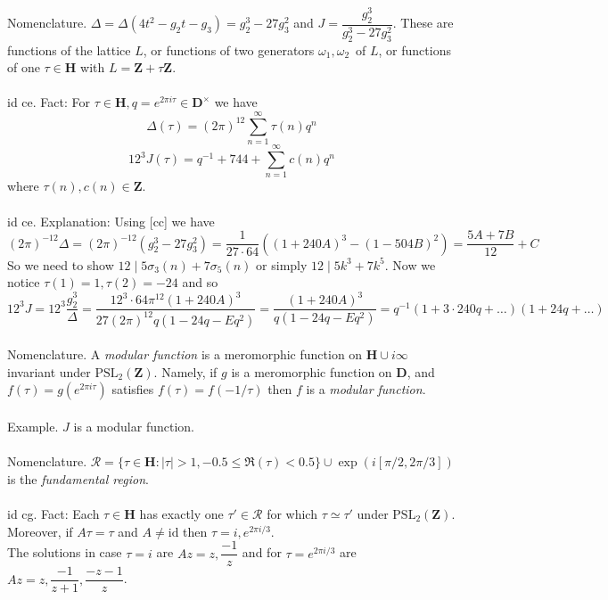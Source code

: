 \documentclass[oneside]{book}
\newcommand{\Z}{\mathbf{Z}}
\newcommand{\PSL}{\mathrm{PSL}}
\newcommand{\set}[1]{\{ #1\}}
\newcommand{\fit}[1]{\left( #1\right)}
\newcommand{\inv}{^{-1}}
\newcommand{\abs}[1]{\left\lvert #1\right\rvert}
\newcommand{\id}{\mathrm{id}}
\renewcommand{\H}{\mathbf{H}}
\newcommand{\D}{\mathbf{D}}
\newcommand{\RR}{\mathscr{R}}
\begin{document}
Nomenclature. $\Delta=\Delta(4t^2-g_2t-g_3)=g_2^3-27g_3^2$ and $J=\dfrac{g_2^3}{g_2^3-27g_3^2}$. These are functions of the lattice $L$, or functions of two generators $\omega_1,\omega_2$\ of $L$, or functions of one $\tau\in\H$ with $L=\Z+\tau\Z$.\\\\


id ce. Fact: For $\tau\in\H, q=e^{2\pi i\tau}\in\D^\times$ we have $$\Delta(\tau)=(2\pi)^{12}\sum_{n=1}^\infty \tau(n)q^n$$
$$12^3J(\tau)=q\inv + 744 + \sum_{n=1}^\infty c(n)q^n$$
where $\tau(n),c(n)\in\Z$.\\\\


id ce. Explanation: Using [cc] we have $$(2\pi)^{-12}\Delta=(2\pi)^{-12}\fit{g_2^3-27g_3^2}=\dfrac{1}{27\cdot 64}\fit{(1+240A)^3 - (1-504B)^2} = \dfrac{5A+7B}{12}+ C $$ 
So we need to show $12\mid 5\sigma_3(n)+7\sigma_5(n)$ or simply $12\mid 5k^3+7k^5$. Now we notice $\tau(1)=1, \tau(2)=-24$ and so
$$12^3J = 12^3 \dfrac{g_2^3}{\Delta} = \dfrac{12^3 \cdot 64\pi^{12}(1+240A)^3}{27(2\pi)^{12}q(1-24q-Eq^2)}=\dfrac{(1+240A)^3}{q(1-24q-Eq^2)}=q\inv(1+3\cdot 240q+\dots)(1+24q+\dots)$$\\


Nomenclature. A {\it modular function} is a meromorphic function on $\H\cup{i\infty}$ invariant under $\PSL_2(\Z)$. Namely, if $g$ is a meromorphic function on $\D$, and $f(\tau)=g(e^{2\pi i\tau})$ satisfies $f(\tau)=f(-1/\tau)$ then $f$ is a {\it modular function}.\\\\


Example. $J$ is a modular function.\\\\


Nomenclature. $\RR=\set{\tau\in\H: \abs{\tau}>1, -0.5\le\Re(\tau)< 0.5}\cup \exp(i[\pi/2,2\pi/3])$ is the {\it fundamental region}.\\\\


id cg. Fact: Each $\tau\in \H$ has exactly one $\tau'\in \RR$ for which $\tau\simeq \tau'$ under $\PSL_2(\Z)$. \\
Moreover, if $A\tau=\tau$ and $A\neq\id$ then $\tau = i,e^{2\pi i/3}$. \\
The solutions in case $\tau=i$ are $Az=z,\dfrac{-1}{z}$ and for $\tau=e^{2\pi i/3}$ are $Az=z, \dfrac{-1}{z+1}, \dfrac{-z-1}{z}$. \\\\
\end{document}
